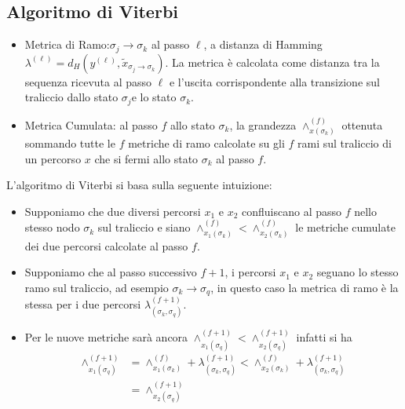     \subsection{Algoritmo di Viterbi}
        \begin{itemize}
            \item {Metrica di Ramo:$\sigma_j\rightarrow\sigma_k$ al passo $\ell$, a distanza di Hamming
                $\lambda^{(\ell)}= d_H(y^{(\ell)},\tilde{x}_{\sigma_j\rightarrow\sigma_k})$. La metrica è 
                calcolata come distanza tra la sequenza ricevuta al passo $\ell$ e l'uscita corrispondente
                alla transizione sul traliccio dallo stato $\sigma_j$e lo stato $\sigma_k$.
            }
            \item {Metrica Cumulata: al passo $f$ allo stato $\sigma_k$, la grandezza $\wedge_{x(\sigma_k)}^{(f)}$ ottenuta 
                sommando tutte le $f$ metriche di ramo calcolate su gli $f$ rami sul traliccio di un percorso $x$ che si fermi allo stato 
                $\sigma_k$ al passo $f$.
            }
        \end{itemize}
        L'algoritmo di Viterbi si basa sulla seguente intuizione:
        \begin{itemize}
            \item {Supponiamo che due diversi percorsi $x_1$ e $x_2$ confluiscano al passo $f$ nello stesso nodo $\sigma_k$
                sul traliccio e siano $\wedge_{x_1 (\sigma_k)}^{(f)}<\wedge_{x_2 (\sigma_k)}^{(f)}$ le metriche cumulate dei due
                percorsi calcolate al passo $f$.
            }
            \item {Supponiamo che al passo successivo $f+1$, i percorsi $x_1$ e $x_2$ seguano lo stesso
                ramo sul traliccio, ad esempio $\sigma_k\rightarrow\sigma_q$, in questo caso la metrica di ramo è la stessa per i due 
                percorsi $\lambda^{(f+1)}_{(\sigma_k,\sigma_q)}$. 
            }
            \item {Per le nuove metriche sarà ancora $\wedge_{x_1 (\sigma_q)}^{(f+1)}<\wedge_{x_2 (\sigma_q)}^{(f+1)}$
                infatti si ha 
                \begin{align}
                    \wedge_{x_1 (\sigma_q)}^{(f+1)} &= \wedge_{x_1 (\sigma_k)}^{(f)}+\lambda^{(f+1)}_{(\sigma_k,\sigma_q)} < \wedge_{x_2 (\sigma_k)}^{(f)}+\lambda^{(f+1)}_{(\sigma_k,\sigma_q)} \nonumber\\
                                                    &= \wedge_{x_2 (\sigma_q)}^{(f+1)}\nonumber
                \end{align}
            }
        \end{itemize}
